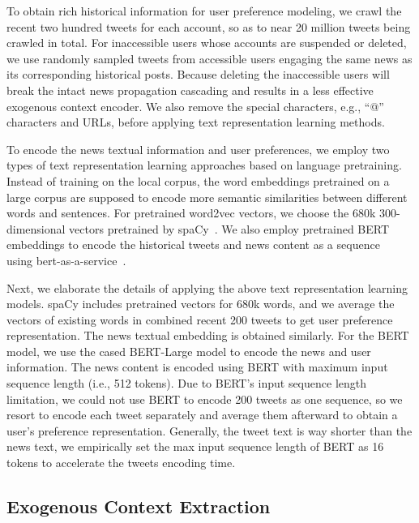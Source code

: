 \documentclass[sigconf]{acmart}
\begin{document}
To obtain rich historical information for user preference modeling, we crawl the recent two hundred tweets for each account, so as to near 20 million tweets being crawled in total.
For inaccessible users whose accounts are suspended or deleted, we use randomly sampled tweets from accessible users engaging the same news as its corresponding historical posts.
Because deleting the inaccessible users will break the intact news propagation cascading and results in a less effective exogenous context encoder. 
We also remove the special characters, e.g., ``@'' characters and URLs, before applying text representation learning methods.


To encode the news textual information and user preferences, we employ two types of text representation learning approaches based on language pretraining.
Instead of training on the local corpus, the word embeddings pretrained on a large corpus are supposed to encode more semantic similarities between different words and sentences.
For pretrained word2vec vectors, we choose the 680k 300-dimensional vectors pretrained by spaCy~\cite{honnibal2017spacy}.  
We also employ pretrained BERT embeddings to encode the historical tweets and news content as a sequence~\cite{devlin2018bert} using bert-as-a-service~\cite{xiao2018bertservice}.


Next, we elaborate the details of applying the above text representation learning models. 
spaCy includes pretrained vectors for 680k words, and we average the vectors of existing words in combined recent 200 tweets to get user preference representation.
The news textual embedding is obtained similarly.
For the BERT model, we use the cased BERT-Large model to encode the news and user information.   
The news content is encoded using BERT with maximum input sequence length (i.e., 512 tokens).
Due to BERT's input sequence length limitation, we could not use BERT to encode 200 tweets as one sequence, so we resort to encode each tweet separately and average them afterward to obtain a user's preference representation.
Generally, the tweet text is way shorter than the news text, we empirically set the max input sequence length of BERT as 16 tokens to accelerate the tweets encoding time. 


\subsection{Exogenous Context Extraction}
\label{sec:build_graph}
\end{document}
